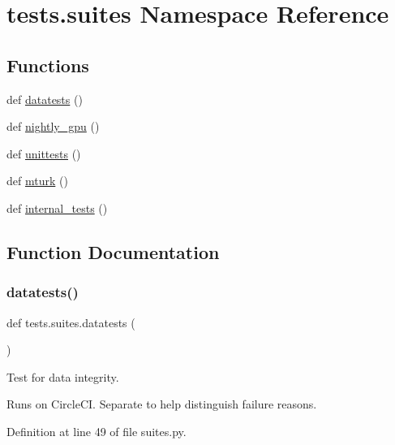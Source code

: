 \hypertarget{namespacetests_1_1suites}{}\section{tests.\+suites Namespace Reference}
\label{namespacetests_1_1suites}
\subsection*{Functions}
\begin{DoxyCompactItemize}
\item 
def \hyperlink{namespacetests_1_1suites_a1e7ee73a4d3645058850bc743ad6b668}{datatests} ()
\item 
def \hyperlink{namespacetests_1_1suites_ab1df665f54fccb5bbceb95cf8e4498b9}{nightly\+\_\+gpu} ()
\item 
def \hyperlink{namespacetests_1_1suites_a02a7d577493ceb024319292b96e13265}{unittests} ()
\item 
def \hyperlink{namespacetests_1_1suites_a5d5a0bb14f72dd9c86a97cc6ca6add87}{mturk} ()
\item 
def \hyperlink{namespacetests_1_1suites_aaa84dd961fb392c540b3a116119be21c}{internal\+\_\+tests} ()
\end{DoxyCompactItemize}


\subsection{Function Documentation}
\mbox{\label{namespacetests_1_1suites_a1e7ee73a4d3645058850bc743ad6b668}} 
\subsubsection{\texorpdfstring{datatests()}{datatests()}}
{\footnotesize\ttfamily def tests.\+suites.\+datatests (\begin{DoxyParamCaption}{ }\end{DoxyParamCaption})}

\begin{DoxyVerb}Test for data integrity.

Runs on CircleCI. Separate to help distinguish failure reasons.
\end{DoxyVerb}
 

Definition at line 49 of file suites.\+py.


